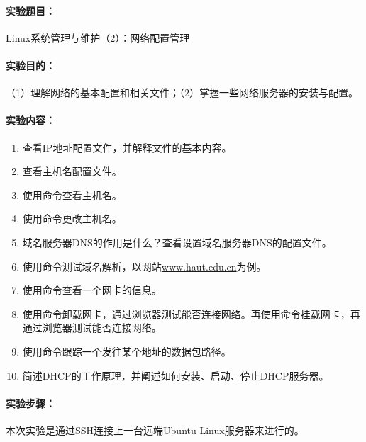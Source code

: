 \documentclass[cs4size,a4paper,nofonts]{ctexart}
\def\titlec{Linux系统管理与维护（2）：网络配置管理}
\begin{document}




\paragraph{实验题目：}\titlec

\paragraph{实验目的：}
（1）理解网络的基本配置和相关文件；（2）掌握一些网络服务器的安装与配置。

\paragraph{实验内容：}
\begin{enumerate}
\item 查看IP地址配置文件，并解释文件的基本内容。
\item 查看主机名配置文件。
\item 使用命令查看主机名。
\item 使用命令更改主机名。
\item 域名服务器DNS的作用是什么？查看设置域名服务器DNS的配置文件。
\item 使用命令测试域名解析，以网站\url{www.haut.edu.cn}为例。 
\item 使用命令查看一个网卡的信息。
\item 使用命令卸载网卡，通过浏览器测试能否连接网络。再使用命令挂载网卡，再通过浏览器测试能否连接网络。
\item 使用命令跟踪一个发往某个地址的数据包路径。 
\item 简述DHCP的工作原理，并阐述如何安装、启动、停止DHCP服务器。
\end{enumerate}

\paragraph{实验步骤：}

\newcommand{\image}[3][width=0.8\textwidth]{
    \centering
        \texttt{[image: images/exp7/\#2.png]}
    \caption{#3}
    \label{fig:#3}
}

本次实验是通过SSH连接上一台远端Ubuntu Linux服务器来进行的。
\end{document}
